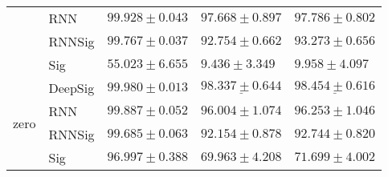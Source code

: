 \begin{tabular}{lllll}
                                 & RNN     &                           $ 99.928 \pm 0.043 $ &                           $ 97.668 \pm 0.897 $ &                           $ 97.786 \pm 0.802 $ \\
                                 & RNNSig  &                           $ 99.767 \pm 0.037 $ &                           $ 92.754 \pm 0.662 $ &                           $ 93.273 \pm 0.656 $ \\
                                 & Sig     &                           $ 55.023 \pm 6.655 $ &                            $ 9.436 \pm 3.349 $ &                            $ 9.958 \pm 4.097 $ \\
\midrule
\multirow{4}{*}{zero}            & DeepSig &               $  \mathbf{ 99.980 \pm 0.013 } $ &            $  \underline{ 98.337 \pm 0.644 } $ &            $  \underline{ 98.454 \pm 0.616 } $ \\
                                 & RNN     &                           $ 99.887 \pm 0.052 $ &                           $ 96.004 \pm 1.074 $ &                           $ 96.253 \pm 1.046 $ \\
                                 & RNNSig  &                           $ 99.685 \pm 0.063 $ &                           $ 92.154 \pm 0.878 $ &                           $ 92.744 \pm 0.820 $ \\
                                 & Sig     &                           $ 96.997 \pm 0.388 $ &                           $ 69.963 \pm 4.208 $ &                           $ 71.699 \pm 4.002 $ \\
\bottomrule
\end{tabular}
